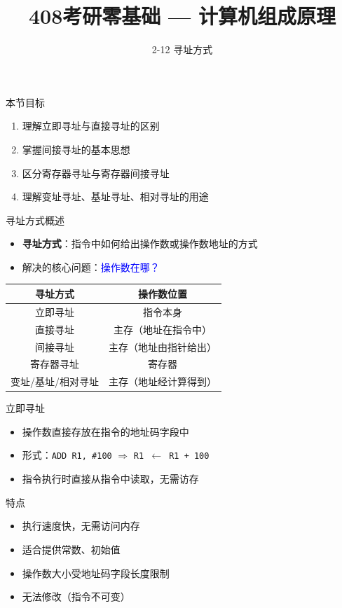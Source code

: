 \documentclass[10pt, aspectratio=169]{beamer}
\title{408考研零基础 --- 计算机组成原理}
\subtitle{2-12 寻址方式}
\author{}
\date{}
\begin{document}
\begin{frame}{本节目标}
    \begin{enumerate}
        \item 理解立即寻址与直接寻址的区别
        \item 掌握间接寻址的基本思想
        \item 区分寄存器寻址与寄存器间接寻址
        \item 理解变址寻址、基址寻址、相对寻址的用途
    \end{enumerate}
\end{frame}

\begin{frame}{寻址方式概述}
    \begin{itemize}
        \item \textbf{寻址方式}：指令中如何给出操作数或操作数地址的方式
        \item 解决的核心问题：\textcolor{blue}{操作数在哪？}
    \end{itemize}
    \vspace{0.5em}
    \begin{center}
        \begin{tabular}{|c|c|}
            \hline
            \textbf{寻址方式} & \textbf{操作数位置} \\
            \hline
            立即寻址 & 指令本身 \\
            直接寻址 & 主存（地址在指令中） \\
            间接寻址 & 主存（地址由指针给出） \\
            寄存器寻址 & 寄存器 \\
            变址/基址/相对寻址 & 主存（地址经计算得到） \\
            \hline
        \end{tabular}
    \end{center}
\end{frame}

\begin{frame}{立即寻址}
    \begin{itemize}
        \item 操作数直接存放在指令的地址码字段中
        \item 形式：\texttt{ADD R1, \#100} $\Rightarrow$ \texttt{R1 $\leftarrow$ R1 + 100}
        \item 指令执行时直接从指令中读取，无需访存
    \end{itemize}
    \vspace{0.3em}
    \begin{block}{特点}
        \begin{itemize}
            \item[+] 执行速度快，无需访问内存
            \item[+] 适合提供常数、初始值
            \item[-] 操作数大小受地址码字段长度限制
            \item[-] 无法修改（指令不可变）
        \end{itemize}
    \end{block}
\end{frame}
\end{document}
